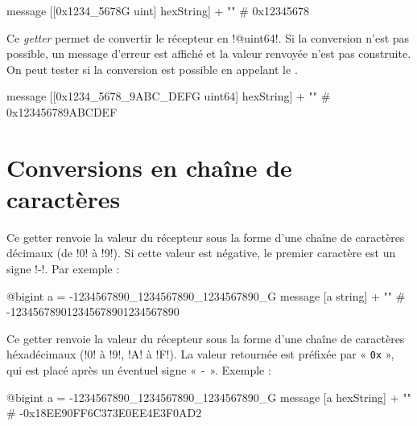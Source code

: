 \begin{galgas}
message [[0x1234_5678G uint] hexString] + "\n" # 0x12345678
\end{galgas}



Ce \emph{getter} permet de convertir le récepteur en \ggs!@uint64!. Si la conversion n'est pas possible, un message d'erreur est affiché et la valeur renvoyée n'est pas construite. On peut tester si la conversion est possible en appelant le .

\begin{galgas}
message [[0x1234_5678_9ABC_DEFG uint64] hexString] + "\n" # 0x123456789ABCDEF
\end{galgas}







\section{Conversions en chaîne de caractères}


Ce getter renvoie la valeur du récepteur sous la forme d'une chaîne de caractères décimaux (de \ggs!0! à \ggs!9!). Si cette valeur est négative, le premier caractère est un signe \ggs!-!. Par exemple :

\begin{galgas}
@bigint a = -1234567890_1234567890_1234567890_G
message [a string] + "\n" # -123456789012345678901234567890
\end{galgas}






Ce getter renvoie la valeur du récepteur sous la forme d'une chaîne de caractères héxadécimaux (\ggs!0! à \ggs!9!, \ggs!A! à \ggs!F!). La valeur retournée est préfixée par « \texttt{0x} », qui est placé après un éventuel signe « \texttt{-} ». Exemple :

\begin{galgas}
@bigint a = -1234567890_1234567890_1234567890_G
message [a hexString] + "\n" # -0x18EE90FF6C373E0EE4E3F0AD2
\end{galgas}








